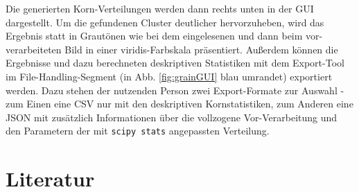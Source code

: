 \documentclass[
  12pt,
]{book}
\begin{document}
Die generierten Korn-Verteilungen werden dann rechts unten in der GUI dargestellt. Um die gefundenen Cluster deutlicher hervorzuheben, wird das Ergebnis statt in Grautönen wie bei dem eingelesenen und dann beim vor-verarbeiteten Bild in einer viridis-Farbskala präsentiert. Außerdem können die Ergebnisse und dazu berechneten deskriptiven Statistiken mit dem Export-Tool im File-Handling-Segment (in Abb. \ref{fig:grainGUI} blau umrandet) exportiert werden. Dazu stehen der nutzenden Person zwei Export-Formate zur Auswahl - zum Einen eine CSV nur mit den deskriptiven Kornstatistiken, zum Anderen eine JSON mit zusätzlich Informationen über die vollzogene Vor-Verarbeitung und den Parametern der mit \texttt{scipy\ stats} angepassten Verteilung.

\hypertarget{literatur}{%
\chapter{Literatur}\label{literatur}}
\end{document}
